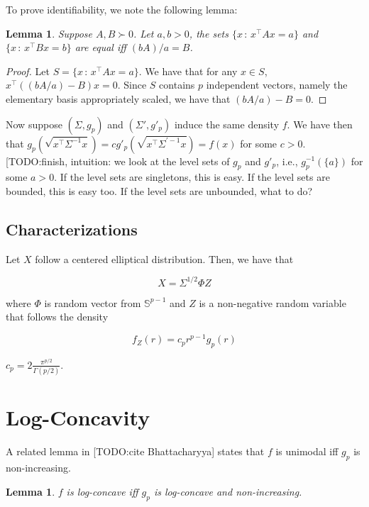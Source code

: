 \documentclass[12pt]{article}
\newtheorem{lemma}[theorem]{Lemma}
\begin{document}
To prove identifiability, we note the following lemma:
\begin{lemma}
Suppose $A, B \succ 0$. Let $a, b >0$, the sets $\{ x \,:\, x^\top A x = a \}$ and $\{ x \,:\, x^\top B x = b \}$ are equal iff $ (bA)/a = B$. 
\end{lemma}

\begin{proof}
Let $S = \{ x \,:\, x^\top A x = a\}$. We have that for any $x \in S$, $x^\top ( (bA/a) - B) x = 0$. Since $S$ contains $p$ independent vectors, namely the elementary basis appropriately scaled, we have that $(bA/a) - B = 0$. 
\end{proof}

Now suppose $(\Sigma, g_p)$ and $(\Sigma', g'_p)$ induce the same density $f$. We have then that $g_p( \sqrt{x^\top \Sigma^{-1} x} ) = c g'_p( \sqrt{ x^\top \Sigma^{\prime -1} x } ) = f(x)$ for some $c > 0$.\\

[TODO:finish, intuition: we look at the level sets of $g_p$ and $g'_p$, i.e., $g_p^{-1}(\{a\})$ for some $a > 0$. If the level sets are singletons, this is easy. If the level sets are bounded, this is easy too. If the level sets are unbounded, what to do?



\subsection{Characterizations}


Let $X$ follow a centered elliptical distribution. Then, we have that

\[
X = \Sigma^{1/2} \Phi Z
\]

where $\Phi$ is random vector from $\mathbb{S}^{p-1}$ and $Z$ is a non-negative random variable that follows the density

\[
f_Z(r) = c_p r^{p - 1} g_p(r)
\]

$c_p = 2 \frac{ \pi^{p/2}}{\Gamma(p/2)}$.



\section{Log-Concavity}

A related lemma in [TODO:cite Bhattacharyya] states that $f$ is unimodal iff $g_p$ is non-increasing. 

\begin{lemma}
$f$ is log-concave iff $g_p$ is log-concave and non-increasing.
\end{lemma}
\end{document}
